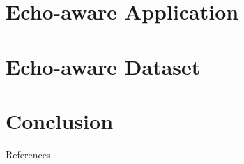 \documentclass[8pt,dvipsnames,aspectratio=43,compress]{beamer}
\begin{document}
    {
      \makeatletter
      \def\beamer@writeslidentry{\clearpage\beamer@notesactions}
      \makeatother
      \section{Echo-aware Application}
    }
    

    {
      \makeatletter
      \def\beamer@writeslidentry{\clearpage\beamer@notesactions}
      \makeatother
      \section{Echo-aware Dataset}
    }
    

    {
      \makeatletter
      \def\beamer@writeslidentry{\clearpage\beamer@notesactions}
      \makeatother
      \section{Conclusion}
    }
    


    \appendix





    \begin{frame}[allowframebreaks]{References}
        
        

    \end{frame}

    {
    
    
    
    }
\end{document}
